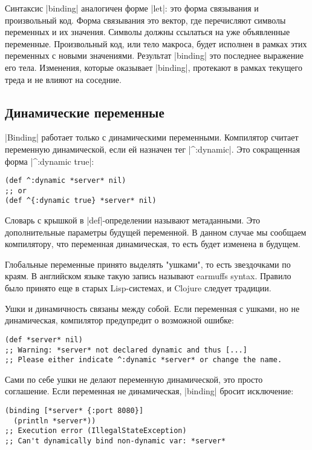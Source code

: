 Синтаксис \spverb|binding| аналогичен форме \spverb|let|: это форма связывания и произвольный
код. Форма связывания это вектор, где перечисляют символы переменных и их
значения. Символы должны ссылаться на уже объявленные переменные. Произвольный
код, или тело макроса, будет исполнен в рамках этих переменных с новыми
значениями. Результат \spverb|binding| это последнее выражение его тела. Изменения,
которые оказывает \spverb|binding|, протекают в рамках текущего треда и не влияют на
соседние.

\subsection{Динамические переменные}

\spverb|Binding| работает только с динамическими переменными. Компилятор считает
переменную динамической, если ей назначен тег \spverb|^:dynamic|. Это сокращенная форма
\spverb|^{:dynamic true}|:

\begin{verbatim}
(def ^:dynamic *server* nil)
;; or
(def ^{:dynamic true} *server* nil)
\end{verbatim}

Словарь с крышкой в \spverb|def|-определении называют метаданными. Это дополнительные
параметры будущей переменной. В данном случае мы сообщаем компилятору, что
переменная динамическая, то есть будет изменена в будущем.

Глобальные переменные принято выделять "ушками", то есть звездочками по краям. В
английском языке такую запись называют earmuffs syntax. Правило было принято еще
в старых Lisp-системах, и Clojure следует традиции.

Ушки и динамичность связаны между собой. Если переменная с ушками, но не
динамическая, компилятор предупредит о возможной ошибке:

\begin{verbatim}
(def *server* nil)
;; Warning: *server* not declared dynamic and thus [...]
;; Please either indicate ^:dynamic *server* or change the name.
\end{verbatim}

Сами по себе ушки не делают переменную динамической, это просто соглашение. Если
переменная не динамическая, \spverb|binding| бросит исключение:

\begin{verbatim}
(binding [*server* {:port 8080}]
  (println *server*))
;; Execution error (IllegalStateException)
;; Can't dynamically bind non-dynamic var: *server*
\end{verbatim}

